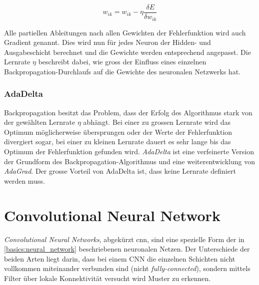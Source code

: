 \begin{equation}
w_{ik} = w_{ik} - \eta \frac{\delta E}{\delta w_{ik}}
\end{equation}

Alle partiellen Ableitungen nach allen Gewichten der Fehlerfunktion wird auch Gradient genannt. Dies wird nun für jedes Neuron der Hidden- und Ausgabeschicht berechnet und die Gewichte werden entsprechend angepasst. Die Lernrate $\eta$ beschreibt dabei, wie gross der Einfluss eines einzelnen Backpropagation-Durchlaufs auf die Gewichte des neuronalen Netzwerks hat.
\subsubsection{AdaDelta}
Backpropagation besitzt das Problem, dass der Erfolg des Algorithmus stark von der gewählten Lernrate $\eta$ abhängt. Bei einer zu grossen Lernrate wird das Optimum möglicherweise übersprungen oder der Werte der Fehlerfunktion divergiert sogar, bei einer zu kleinen Lernrate dauert es sehr lange bis das Optimum der Fehlerfunktion gefunden wird. \emph{AdaDelta} \cite{zeiler2012adadelta} ist eine verfeinerte Version der Grundform des Backpropagation-Algorithmus und eine weiterentwicklung von \emph{AdaGrad}. Der grosse Vorteil von AdaDelta ist, dass keine Lernrate definiert werden muss. 
\section{Convolutional Neural Network}
\emph{Convolutional Neural Networks}, abgekürzt \gls{cnn}, sind eine spezielle Form der in \ref{basics:neural_network} beschriebenen neuronalen Netzen. Der Unterschiede der beiden Arten liegt darin, dass bei einem CNN die einzelnen Schichten nicht vollkommen miteinander verbunden sind (nicht \emph{fully-connected}), sondern mittels Filter über lokale Konnektivität versucht wird Muster zu erkennen.
